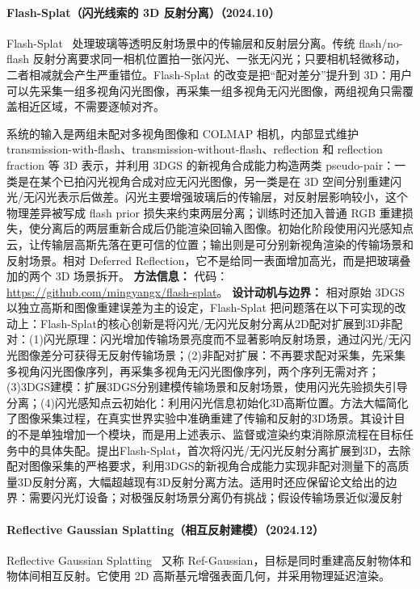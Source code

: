 \paragraph{Flash-Splat（闪光线索的 3D 反射分离）（2024.10）}
Flash-Splat~\cite{2410_02764} 处理玻璃等透明反射场景中的传输层和反射层分离。传统 flash/no-flash 反射分离要求同一相机位置拍一张闪光、一张无闪光；只要相机轻微移动，二者相减就会产生严重错位。Flash-Splat 的改变是把“配对差分”提升到 3D：用户可以先采集一组多视角闪光图像，再采集一组多视角无闪光图像，两组视角只需覆盖相近区域，不需要逐帧对齐。

系统的输入是两组未配对多视角图像和 COLMAP 相机，内部显式维护 transmission-with-flash、transmission-without-flash、reflection 和 reflection fraction 等 3D 表示，并利用 3DGS 的新视角合成能力构造两类 pseudo-pair：一类是在某个已拍闪光视角合成对应无闪光图像，另一类是在 3D 空间分别重建闪光/无闪光表示后做差。闪光主要增强玻璃后的传输层，对反射层影响较小，这个物理差异被写成 flash prior 损失来约束两层分离；训练时还加入普通 RGB 重建损失，使分离后的两层重新合成后仍能渲染回输入图像。初始化阶段使用闪光感知点云，让传输层高斯先落在更可信的位置；输出则是可分别新视角渲染的传输场景和反射场景。相对 Deferred Reflection，它不是给同一表面增加高光，而是把玻璃叠加的两个 3D 场景拆开。
\textbf{方法信息：} 代码：\url{https://github.com/mingyangx/flash-splat}。
\textbf{设计动机与边界：} 相对原始 3DGS 以独立高斯和图像重建误差为主的设定，Flash-Splat 把问题落在以下可实现的改动上：Flash-Splat的核心创新是将闪光/无闪光反射分离从2D配对扩展到3D非配对：(1)闪光原理：闪光增加传输场景亮度而不显著影响反射场景，通过闪光/无闪光图像差分可获得无反射传输场景；(2)非配对扩展：不再要求配对采集，先采集多视角闪光图像序列，再采集多视角无闪光图像序列，两个序列无需对齐；(3)3DGS建模：扩展3DGS分别建模传输场景和反射场景，使用闪光先验损失引导分离；(4)闪光感知点云初始化：利用闪光信息初始化3D高斯位置。方法大幅简化了图像采集过程，在真实世界实验中准确重建了传输和反射的3D场景。其设计目的不是单独增加一个模块，而是用上述表示、监督或渲染约束消除原流程在目标任务中的具体失配。提出Flash-Splat，首次将闪光/无闪光反射分离扩展到3D，去除配对图像采集的严格要求，利用3DGS的新视角合成能力实现非配对测量下的高质量3D反射分离，大幅超越现有3D反射分离方法。适用时还应保留论文给出的边界：需要闪光灯设备；对极强反射场景分离仍有挑战；假设传输场景近似漫反射
\paragraph{Reflective Gaussian Splatting（相互反射建模）（2024.12）}
Reflective Gaussian Splatting~\cite{2412_19282} 又称 Ref-Gaussian，目标是同时重建高反射物体和物体间相互反射。它使用 2D 高斯基元增强表面几何，并采用物理延迟渲染。

